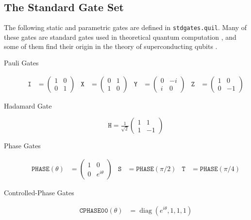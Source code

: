 \documentclass[conference]{IEEEtran}
\newcommand{\diag}{\mathop{\mathrm{diag}}\nolimits}
\begin{document}
\subsection{The Standard Gate Set}\label{sec:stdgates}
The following static and parametric gates are defined in \verb|stdgates.quil|. Many of these gates are standard gates used in theoretical quantum computation \cite{nielsen2010quantum}, and some of them find their origin in the theory of superconducting qubits \cite{chow2010quantum}.
\begin{description}
\item[Pauli Gates]
\begin{align*}
\texttt{I} &= \left(\begin{smallmatrix}
1 & 0\\
0 & 1
\end{smallmatrix}\right)
&
\texttt{X} &= \left(\begin{smallmatrix}
0 & 1\\
1 & 0
\end{smallmatrix}\right)
&
\texttt{Y} &= \left(\begin{smallmatrix}
0 & -i\\
i & 0
\end{smallmatrix}\right)
&
\texttt{Z} &= \left(\begin{smallmatrix}
1 & 0\\
0 & -1
\end{smallmatrix}\right)
\end{align*}
\item[Hadamard Gate]
\begin{displaymath}
\texttt{H} = \tfrac{1}{\sqrt{2}}\left(\begin{smallmatrix}
1 & 1\\
1 & -1
\end{smallmatrix}\right)
\end{displaymath}
\item[Phase Gates]
\begin{align*}
\texttt{PHASE}(\theta) &= \left(\begin{smallmatrix}
1 & 0\\
0 & e^{i\theta}
\end{smallmatrix}\right)
&
\texttt{S} &= \texttt{PHASE}(\pi/2)
&
\texttt{T} &= \texttt{PHASE}(\pi/4)
\end{align*}
\item[Controlled-Phase Gates]
\begin{align*}
\texttt{CPHASE00}(\theta) &= \diag(e^{i\theta},1,1,1) \\

\end{align*}
\end{description}
\end{document}
